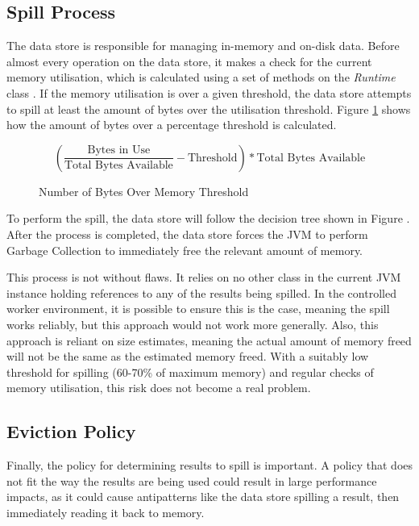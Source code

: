 \subsection{Spill Process}
The data store is responsible for managing in-memory and on-disk data. Before almost every operation on the data store, it makes a check for the current memory utilisation, which is calculated using a set of methods on the \textit{Runtime} class . If the memory utilisation is over a given threshold, the data store attempts to spill at least the amount of bytes over the utilisation threshold. Figure \ref{fig:bytes-over-memory-threshold} shows how the amount of bytes over a percentage threshold is calculated.

\begin{figure}[h]
	\centering
	\[ \left( \frac{\text{Bytes in Use}}{\text{Total Bytes Available}} - \text{Threshold} \right) * \text{Total Bytes Available} \]
	\caption{Number of Bytes Over Memory Threshold}
	\label{fig:bytes-over-memory-threshold}
\end{figure}

To perform the spill, the data store will follow the decision tree shown in Figure . After the process is completed, the data store forces the JVM to perform Garbage Collection to immediately free the relevant amount of memory.


This process is not without flaws. It relies on no other class in the current JVM instance  holding references to any of the results being spilled. In the controlled worker environment, it is possible to ensure this is the case, meaning the spill works reliably, but this approach would not work more generally. Also, this approach is reliant on size estimates, meaning the actual amount of memory freed will not be the same as the estimated memory freed. With a suitably low threshold for spilling (60-70\% of maximum memory) and regular checks of memory utilisation, this risk does not become a real problem.

\subsection{Eviction Policy}
Finally, the policy for determining results to spill is important. A policy that does not fit the way the results are being used could result in large performance impacts, as it could cause antipatterns like the data store spilling a result, then immediately reading it back to memory.

